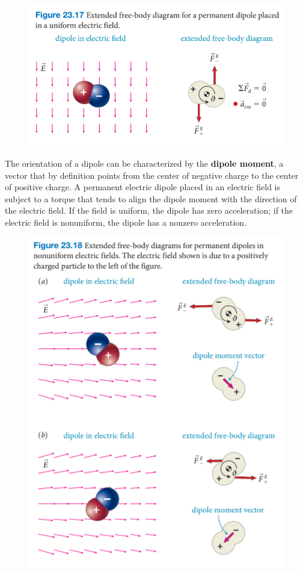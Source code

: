         \pagebreak

        \begin{figure}[hbt!]
            \centering
            \includegraphics[scale = 0.75]{Resources/24.4_Dipole}
        \end{figure}

        The orientation of a dipole can be characterized by the \textbf{dipole moment}, a vector that by definition points from the center of negative charge to the center of positive charge. A permanent electric 
        dipole placed in an electric field is subject to a torque that tends to align the dipole moment with the direction of the electric field. If the field is uniform, the dipole has zero acceleration; if the electric
        field is nonuniform, the dipole has a nonzero acceleration.

        \begin{figure}[hbt!]
            \centering
            \includegraphics[scale = 0.9]{Resources/12.4_Dipole_Moment}
        \end{figure}

